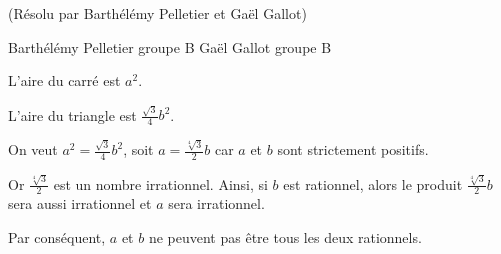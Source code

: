 \begin{sol}[56](Résolu par Barthélémy Pelletier et Gaël Gallot)

Barthélémy Pelletier groupe B
Gaël Gallot groupe B

L'aire du carré est $a^2$.

L'aire du triangle est $\frac{\sqrt{3}}{4}b^2$.

On veut $a^2=\frac{\sqrt{3}}{4}b^2$, soit $a=\frac{\sqrt[4]{3}}{2}b$ car $a$ et $b$ sont strictement positifs.

Or $\frac{\sqrt[4]{3}}{2}$ est un nombre irrationnel.
Ainsi, si $b$ est rationnel, alors le produit $\frac{\sqrt[4]{3}}{2}b$ sera aussi irrationnel et $a$ sera irrationnel.

Par conséquent, $a$ et $b$ ne peuvent pas être tous les deux rationnels.

\end{sol}
